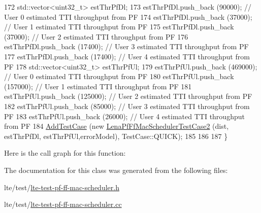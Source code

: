 \begin{DoxyCode}
172   std::vector<uint32\_t> estThrPfDl;
173   estThrPfDl.push\_back (90000); \textcolor{comment}{// User 0 estimated TTI throughput from PF}
174   estThrPfDl.push\_back (37000); \textcolor{comment}{// User 1 estimated TTI throughput from PF}
175   estThrPfDl.push\_back (37000); \textcolor{comment}{// User 2 estimated TTI throughput from PF}
176   estThrPfDl.push\_back (17400); \textcolor{comment}{// User 3 estimated TTI throughput from PF}
177   estThrPfDl.push\_back (17400); \textcolor{comment}{// User 4 estimated TTI throughput from PF}
178   std::vector<uint32\_t> estThrPfUl;
179   estThrPfUl.push\_back (469000); \textcolor{comment}{// User 0 estimated TTI throughput from PF}
180   estThrPfUl.push\_back (157000); \textcolor{comment}{// User 1 estimated TTI throughput from PF}
181   estThrPfUl.push\_back (125000); \textcolor{comment}{// User 2 estimated TTI throughput from PF}
182   estThrPfUl.push\_back (85000); \textcolor{comment}{// User 3 estimated TTI throughput from PF}
183   estThrPfUl.push\_back (26000); \textcolor{comment}{// User 4 estimated TTI throughput from PF}
184   \hyperlink{classns3_1_1TestCase_a3718088e3eefd5d6454569d2e0ddd835}{AddTestCase} (\textcolor{keyword}{new} \hyperlink{classLenaPfFfMacSchedulerTestCase2}{LenaPfFfMacSchedulerTestCase2} (dist, estThrPfDl,
       estThrPfUl,errorModel), TestCase::QUICK);
185 
186 
187 \}
\end{DoxyCode}


Here is the call graph for this function\+:




The documentation for this class was generated from the following files\+:\begin{DoxyCompactItemize}
\item 
lte/test/\hyperlink{lte-test-pf-ff-mac-scheduler_8h}{lte-\/test-\/pf-\/ff-\/mac-\/scheduler.\+h}\item 
lte/test/\hyperlink{lte-test-pf-ff-mac-scheduler_8cc}{lte-\/test-\/pf-\/ff-\/mac-\/scheduler.\+cc}\end{DoxyCompactItemize}
